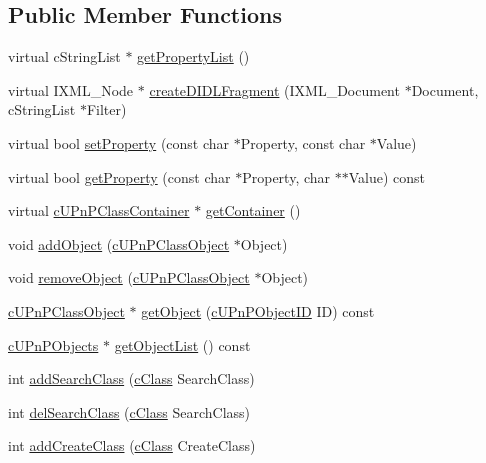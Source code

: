 \subsection*{Public Member Functions}
\begin{CompactItemize}
\item 
virtual cStringList $\ast$ \hyperlink{classcUPnPClassContainer_d952c993314a9352d13f644bb95fbdc2}{getPropertyList} ()
\item 
virtual IXML\_\-Node $\ast$ \hyperlink{classcUPnPClassContainer_fec5b0bae4ed2d194bfc9973f14a3926}{createDIDLFragment} (IXML\_\-Document $\ast$Document, cStringList $\ast$Filter)
\item 
virtual bool \hyperlink{classcUPnPClassContainer_488761ebb4f074ded0d5374f862a1b54}{setProperty} (const char $\ast$Property, const char $\ast$Value)
\item 
virtual bool \hyperlink{classcUPnPClassContainer_f70297d2275e083f05024524d21118d7}{getProperty} (const char $\ast$Property, char $\ast$$\ast$Value) const 
\item 
virtual \hyperlink{classcUPnPClassContainer}{cUPnPClassContainer} $\ast$ \hyperlink{classcUPnPClassContainer_32eb7f1d0b3821f0d9573fe59befdf10}{getContainer} ()
\item 
void \hyperlink{classcUPnPClassContainer_589392682fb7c8e698d09b2eeca83887}{addObject} (\hyperlink{classcUPnPClassObject}{cUPnPClassObject} $\ast$Object)
\item 
void \hyperlink{classcUPnPClassContainer_2e3110bd01c17df34cd60302d9330e72}{removeObject} (\hyperlink{classcUPnPClassObject}{cUPnPClassObject} $\ast$Object)
\item 
\hyperlink{classcUPnPClassObject}{cUPnPClassObject} $\ast$ \hyperlink{classcUPnPClassContainer_b2d43f5d5b6ad40d444b7e353979451d}{getObject} (\hyperlink{structcUPnPObjectID}{cUPnPObjectID} ID) const 
\item 
\hyperlink{classcUPnPObjects}{cUPnPObjects} $\ast$ \hyperlink{classcUPnPClassContainer_ba09b831bbb533d1dbcb6cff4f4b9c23}{getObjectList} () const 
\item 
int \hyperlink{classcUPnPClassContainer_d177af2487ff337fe79ef11fe1e07dd1}{addSearchClass} (\hyperlink{structcClass}{cClass} SearchClass)
\item 
int \hyperlink{classcUPnPClassContainer_3cfb0c2035e678cde990631b804d4ab2}{delSearchClass} (\hyperlink{structcClass}{cClass} SearchClass)
\item 
int \hyperlink{classcUPnPClassContainer_55613e5fa7019137aa818036e91a0811}{addCreateClass} (\hyperlink{structcClass}{cClass} CreateClass)
$$
\end{CompactItemize}
